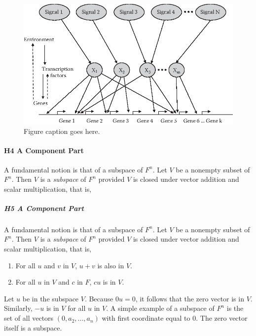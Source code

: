 \begin{figure}\centering
\includegraphics[width=\textwidth]{Chapters/chapter1/figures/002x001.eps}
\caption[List of figure caption goes here]{Figure caption goes here.}
\end{figure}

\paragraph{H4 A Component Part }
A fundamental notion \cite{yao2002can} is that of a subspace of $F^n$. Let $V$ be a nonempty subset of 
$F^n$. Then $V$ is a {\it subspace} of $F^n$ provided $V$ is closed 
under vector addition and scalar multiplication, that is, 

\subparagraph{H5 A Component Part }
A fundamental notion \cite{yao2002can} is that of a subspace of $F^n$. Let $V$ be a nonempty subset of 
$F^n$. Then $V$ is a {\it subspace} of $F^n$ provided $V$ is closed 
under vector addition and scalar multiplication, that is, 
\begin{enumerate}
\item For all $u$ and $v$ in $V$, $u+v$ is 
also in $V$. 
\item For all $u$ in $V$ and $c$ in $F$, $cu$ is 
in $V$. 
\end{enumerate} 
Let $u$ be in the subspace $V$. Because $0u=0$, 
it follows that the zero vector is in $V$. Similarly, $-u$ is in $V$ 
for all $u$ in $V$. A simple example of a subspace of $F^n$ is the set 
of all vectors $(0,a_2,\ldots,a_n)$ with first coordinate equal to 0. 
The zero vector itself is a subspace.



